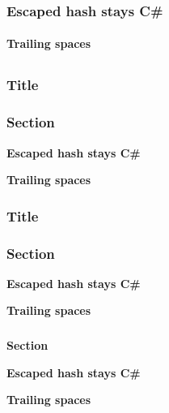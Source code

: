 \subsubsection{Escaped hash stays C\#}

\paragraph{Trailing spaces}

\subsection{}
\begin{frame}[t]
\frametitle{Title}

\end{frame}

\begin{frame}[t]
\frametitle{Section}

\par\medskip\noindent\textbf{Escaped hash stays C\#}\par


\par\medskip\noindent\textbf{Trailing spaces}\par


\end{frame}

\begin{frame}[t]
\frametitle{}

\end{frame}

\begin{frame}[t]
\frametitle{Title}

\end{frame}

\begin{frame}[t]
\frametitle{Section}

\par\medskip\noindent\textbf{Escaped hash stays C\#}\par


\par\medskip\noindent\textbf{Trailing spaces}\par


\end{frame}

\begin{frame}[t]
\frametitle{}

\end{frame}

\begin{frame}[t]

\par\medskip\noindent\textbf{Section}\par


\par\medskip\noindent\textbf{Escaped hash stays C\#}\par


\par\medskip\noindent\textbf{Trailing spaces}\par


\par\medskip\noindent\textbf{}\par

\end{frame}

